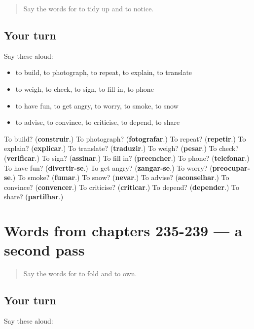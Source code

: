\begin{quote}
Say the words for to tidy up and to notice.
\end{quote}

\subsection*{Your turn}
Say these aloud:

\begin{itemize}
\raggedright
  \item to build, to photograph, to repeat, to explain, to translate
  \item to weigh, to check, to sign, to fill in, to phone
  \item to have fun, to get angry, to worry, to smoke, to snow
  \item to advise, to convince, to criticise, to depend, to share
\end{itemize}

\begin{tcolorbox}[breakable,colback=teal!4,colframe=teal!35!black,title={Before you move on}]
To build? (\textbf{construir}.) To photograph? (\textbf{fotografar}.) To repeat? (\textbf{repetir}.) To explain? (\textbf{explicar}.) To translate? (\textbf{traduzir}.) To weigh? (\textbf{pesar}.) To check? (\textbf{verificar}.) To sign? (\textbf{assinar}.) To fill in? (\textbf{preencher}.) To phone? (\textbf{telefonar}.) To have fun? (\textbf{divertir-se}.) To get angry? (\textbf{zangar-se}.) To worry? (\textbf{preocupar-se}.) To smoke? (\textbf{fumar}.) To snow? (\textbf{nevar}.) To advise? (\textbf{aconselhar}.) To convince? (\textbf{convencer}.) To criticise? (\textbf{criticar}.) To depend? (\textbf{depender}.) To share? (\textbf{partilhar}.)
\end{tcolorbox}
\section[(dialogue)]{Words from chapters 235-239 — a second pass}

\label{lesson:PT-R239-second-pass-words-from-chapters-235-239}



\begin{quote}
Say the words for to fold and to own.
\end{quote}

\subsection*{Your turn}
Say these aloud:

